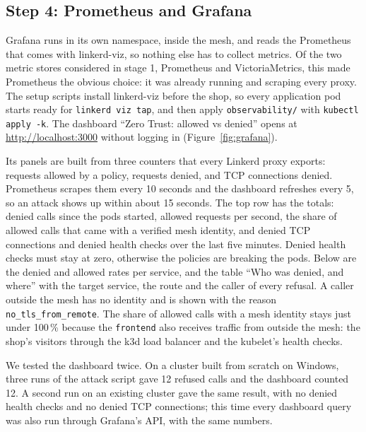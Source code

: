 \documentclass[12pt,a4paper]{article}
\begin{document}
\subsection*{Step 4: Prometheus and Grafana}

Grafana runs in its own namespace, inside the mesh, and reads the Prometheus
that comes with linkerd-viz, so nothing else has to collect metrics. Of the
two metric stores considered in stage 1, Prometheus and VictoriaMetrics, this
made Prometheus the obvious choice: it was already running and scraping every
proxy. The setup
scripts install linkerd-viz before the shop, so every application pod starts
ready for \texttt{linkerd viz tap}, and then apply \texttt{observability/}
with \texttt{kubectl apply -k}. The dashboard ``Zero Trust: allowed vs
denied'' opens at \url{http://localhost:3000} without logging in
(Figure~\ref{fig:grafana}).

Its panels are built from three counters that every Linkerd proxy exports:
requests allowed by a policy, requests denied, and TCP connections denied.
Prometheus scrapes them every 10 seconds and the dashboard refreshes every 5,
so an attack shows up within about 15 seconds. The top row has the totals:
denied calls since the pods started, allowed requests per second, the share
of allowed calls that came with a verified mesh identity, and denied TCP
connections and denied health checks over the last five minutes. Denied
health checks must stay at zero, otherwise the policies are breaking the
pods. Below are the denied and allowed rates per service,
and the table ``Who was denied, and where'' with the target service, the
route and the caller of every refusal. A caller outside the mesh has no
identity and is shown with the reason \texttt{no\_tls\_from\_remote}.
The share of allowed calls with a mesh identity stays just under 100\,\%
because the \texttt{frontend} also receives traffic from outside the mesh:
the shop's visitors through the k3d load balancer and the kubelet's health
checks.

We tested the dashboard twice. On a cluster built from scratch on Windows,
three runs of the attack script gave 12 refused calls and the dashboard
counted 12. A second run on an existing cluster gave the same result, with no
denied health checks and no denied TCP connections; this time every dashboard
query was also run through Grafana's API, with the same numbers.
\end{document}
